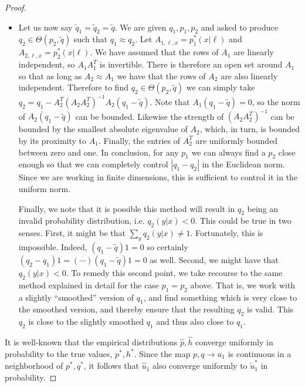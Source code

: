 \begin{proof}
\begin{enumerate}
\begin{itemize}
\item Let us now say $\tilde q_1 = \tilde q_2 = \tilde q$.  We are given $q_1,p_1,p_2$ and asked to
produce $q_2\in \Theta(p_2,\tilde q)$ such that $q_1\approx q_2$.  Let 
$A_{1,\ell,x} = p_1^*(x|\ell)$ and $A_{2,\ell,x} = p_2^*(x|\ell)$.  We have assumed that the rows of $A_1$ are linearly independent, so $A_1 A_1^T$ is invertible.  There is therefore an open set around $A_1$ so that as long as $A_2 \approx A_1$ we have that the rows of $A_2$ are also linearly independent.  Therefore to find $q_2 \in \Theta(p_2, \tilde q)$
we can simply take $q_2 = q_1 - A_2^T (A_2 A_2^T)^{-1} A_2 (q_1 -\tilde q)$.  Note that $A_1 (q_1 - \tilde q) =0$, so
the norm of $A_2 (q_1 -\tilde q)$ can be bounded.  Likewise the strength of $(A_2 A_2^T)^{-1}$
can be bounded by the smallest absolute eigenvalue of $A_2$, which, in turn, is bounded by its proximity to $A_1$.  
Finally, the entries of $A_2^T$ are uniformly bounded between zero and one.  In conclusion, 
for any $p_1$ we can always find a $p_2$ close enough so that we can completely control $|q_1-q_2|$ in the Euclidean
norm.  Since we are working in finite dimensions, this is sufficient to control it in the uniform norm.  

Finally, we note that it is possible this method will result in $q_2$ being an invalid probability distribution, i.e.
$q_2(y|x)<0$.  This could be true in two senses.  First, it might be that $\sum_y q_2(y|x)\neq 1$.  Fortunately,
this is impossible.  Indeed, $(q_1 - \tilde q)1 =0$ so certainly $(q_2-q_1)1=(\cdots)(q_1-\tilde q)1=0$ as well.   
Second, we might have that $q_2(y|x)<0$.  To remedy this
second point, we take recourse to the same method explained in detail for the case $p_1=p_2$ above. 
That is, we work with a slightly ``smoothed'' version of $q_1$, and find something which is very close to the smoothed version,
and thereby ensure that the resulting $q_2$ is valid.  This $q_2$ is close to the slightly smoothed $q_1$ and thus also
close to $q_1$.

\end{itemize}

\end{enumerate}

It is well-known that the empirical distributions $\hat p, \hat h$ converge uniformly in probability to the true values, $p^*,h^*$.  Since the map $p,q \rightarrow u_1$ is continuous in a neighborhood of $p^*,q^*$, it follows that $\hat u_1$ also converge uniformly to $\tilde u_1^*$ in probability.


\end{proof}
